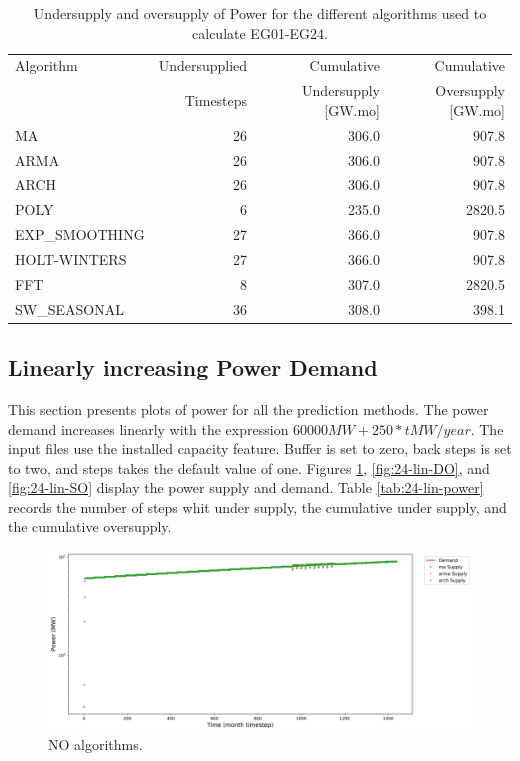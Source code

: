 \documentclass[11pt]{article}
\begin{document}
\begin{table}[!h]
	\centering
	\caption{Undersupply and oversupply of Power for the different algorithms used to calculate EG01-EG24.}
	\label{tab:24-power}
	\begin{tabularx}{\textwidth}{lRRR}
		\hline
		Algorithm & Undersupplied & Cumulative  & Cumulative \\
		& Timesteps     & Undersupply [GW.mo]  & Oversupply [GW.mo] \\ \hline
		MA        & 26 	& 306.0 &  907.8   \\ 
		ARMA      & 26 	& 306.0 &  907.8   \\ 
		ARCH      & 26 	& 306.0 &  907.8   \\ 
		POLY      &  6 	& 235.0 &  2820.5  \\ 
		EXP\_SMOOTHING 	& 27 & 366.0 & 907.8 \\ 
		HOLT-WINTERS  	& 27 & 366.0 & 907.8 \\ 
		FFT       & 8	& 307.0	& 2820.5 \\ 
		SW\_SEASONAL    & 36 & 308.0 & 398.1	\\ \hline
	\end{tabularx}
\end{table}

\subsection{Linearly increasing Power Demand}

This section presents plots of power for all the prediction methods. The power demand increases linearly with the expression $60000 MW + 250*t MW/year$. The input files use the installed capacity feature. Buffer is set to zero, back steps is set to two, and steps takes the default value of one.
Figures \ref{fig:24-lin-NO}, \ref{fig:24-lin-DO}, and \ref{fig:24-lin-SO} display the power supply and demand.
Table \ref{tab:24-lin-power} records the number of steps whit under supply, the cumulative under supply, and the cumulative oversupply.

\begin{figure}[!h]
	\centering
	\includegraphics[width=\textwidth]{24-figures/lin-24-power-buffer01.png} 
	\hfill
	\caption{NO algorithms.}
	\label{fig:24-lin-NO}
\end{figure}
\end{document}
